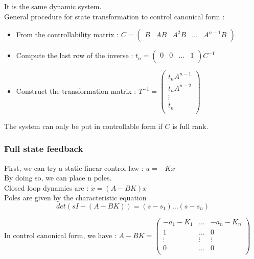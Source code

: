 \documentclass[../main.tex]{subfiles}
\begin{document}
It is the same dynamic system.\\

General procedure for state transformation to control canonical form : \begin{itemize}
    \item From the controllability matrix : $C = \begin{pmatrix}
        B & AB & A^2B & \dots & A^{n-1}B\\
    \end{pmatrix}$\\
    \item Compute the last row of the inverse : $t_n = \begin{pmatrix}
        0 & 0 & \dots & 1\\
    \end{pmatrix}C^{-1}$\\
    \item Construct the transformation matrix : $T^{-1} = \begin{pmatrix}
        t_n A^{n-1}\\ t_n A^{n-2}\\ \vdots \\ t_n\\
    \end{pmatrix}$
\end{itemize}

\warning The system can only be put in controllable form if $C$ is full rank.\\

\subsubsection{Full state feedback}

First, we can try a static linear control law : $u = -Kx$\\
By doing so, we can place n poles.\\
Closed loop dynamics are : $\dot{x} = (A-BK)x$\\

Poles are given by the characteristic equation \begin{equation}
    det(sI-(A-BK)) = (s-s_1)\dots (s-s_n)
\end{equation}

In control canonical form, we have : $A-BK = \begin{pmatrix}
    -a_1 - K_1 & \dots & -a_n-K_n\\
    1 & \dots & 0\\
    \vdots & \vdots & \vdots\\
    0 & \dots & 0\\
\end{pmatrix}$\\
\end{document}
